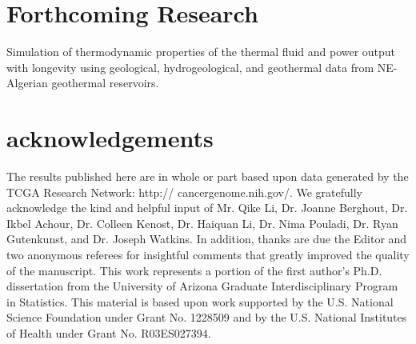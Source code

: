 \documentclass[a0,portrait]{a0poster}
\begin{document}
\begin{multicols}{3}

\section*{Forthcoming Research}

Simulation of thermodynamic properties of the thermal fluid and power output with longevity using geological, hydrogeological, and geothermal data from NE-Algerian geothermal reservoirs. 


\section*{acknowledgements}

The results published here are in whole or part based upon data generated by the TCGA Research Network: http:// cancergenome.nih.gov/. We gratefully acknowledge the kind and helpful input of Mr. Qike Li, Dr. Joanne Berghout, Dr. Ikbel Achour, Dr. Colleen Kenost, Dr. Haiquan Li, Dr. Nima Pouladi, Dr. Ryan Gutenkunst, and Dr. Joseph Watkins. In addition, thanks are due the Editor and two anonymous referees for insightful comments that greatly improved the quality of the manuscript. This work represents a portion of the first author’s Ph.D. dissertation from the University of Arizona Graduate Interdisciplinary Program in Statistics. This material is based upon work supported by the U.S. National Science Foundation under Grant No. 1228509 and by the U.S. National Institutes of Health under Grant No. R03ES027394.



\end{multicols}
\end{document}
